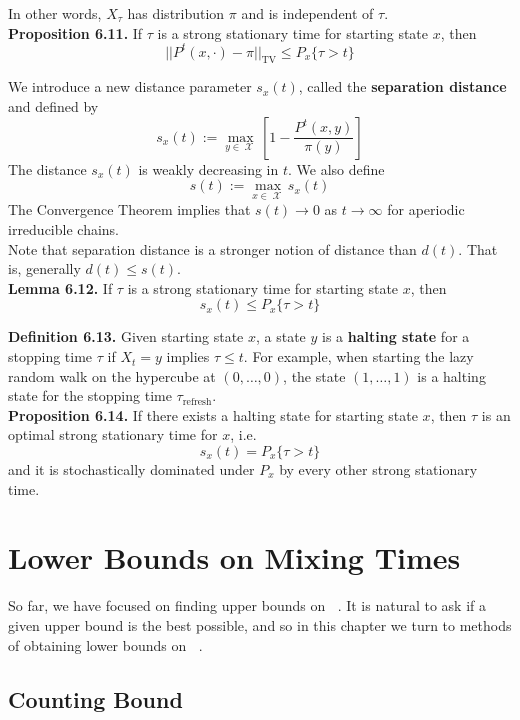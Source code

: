 \documentclass[12pt]{article}
\DeclareMathOperator*{\TV}{\text{TV}}
\DeclareMathOperator*{\mix}{t_{\text{mix}}}
\DeclareMathOperator*{\X}{\mathcal{X}}
\begin{document}
In other words, $X_{\tau}$ has distribution $\pi$ and is independent of $\tau$.\\

\textbf{Proposition 6.11.} If $\tau$ is a strong stationary time for starting state $x$, then $$||P^t(x, \cdot) - \pi||_{\TV} \leq P_x\{\tau > t\}$$

We introduce a new distance parameter $s_x(t)$, called the \textbf{separation distance} and defined by $$s_x(t) := \max_{y \in \X} \left[1 - \frac{P^t(x,y)}{\pi(y)} \right]$$ The distance $s_x(t)$ is weakly decreasing in $t$. We also define $$s(t) := \max_{x \in \X} s_x(t)$$ The Convergence Theorem implies that $s(t) \to 0$ as $t \to \infty$ for aperiodic irreducible chains.\\

Note that separation distance is a stronger notion of distance than $d(t)$. That is, generally $d(t) \leq s(t)$.\\

\textbf{Lemma 6.12.} If $\tau$ is a strong stationary time for starting state $x$, then $$s_x(t) \leq P_x\{\tau > t\}$$

\textbf{Definition 6.13.} Given starting state $x$, a state $y$ is a \textbf{halting state} for a stopping time $\tau$ if $X_t = y$ implies $\tau \leq t$. For example, when starting the lazy random walk on the hypercube at $(0, \ldots, 0)$, the state $(1, \ldots, 1)$ is a halting state for the stopping time $\tau_{\text{refresh}}$.\\

\textbf{Proposition 6.14.} If there exists a halting state for starting state $x$, then $\tau$ is an optimal strong stationary time for $x$, i.e. $$s_x(t) = P_x\{\tau > t\}$$ and it is stochastically dominated under $P_x$ by every other strong stationary time.


\section{Lower Bounds on Mixing Times}

So far, we have focused on finding upper bounds on $\mix$. It is natural to ask if a given upper bound is the best possible, and so in this chapter we turn to methods of obtaining lower bounds on $\mix$.

\subsection{Counting Bound}
\end{document}
